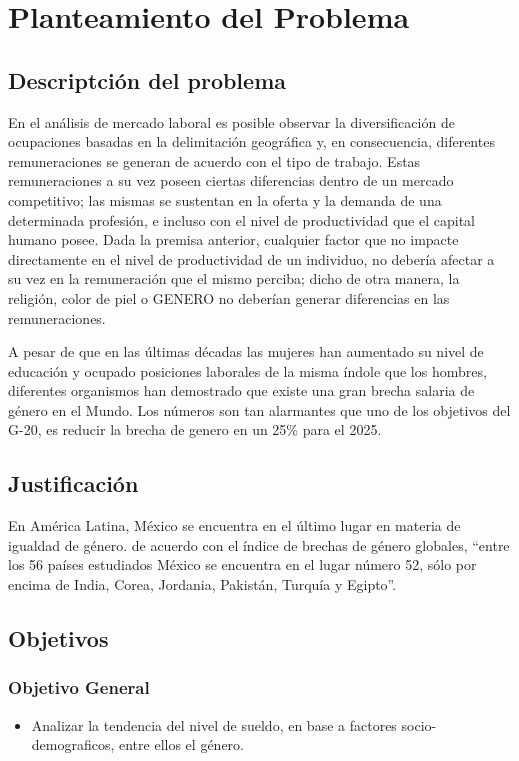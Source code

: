 \newpage
\section{Planteamiento del Problema}

\subsection{Descriptci\'on del problema}
En el an\'alisis de mercado laboral es posible observar la diversificaci\'on de ocupaciones basadas en la delimitaci\'on geogr\'afica y, en consecuencia, diferentes remuneraciones se generan de acuerdo con el tipo de trabajo. Estas remuneraciones a su vez poseen ciertas diferencias dentro de un mercado competitivo; las mismas se sustentan en la oferta y la demanda de una determinada profesi\'on, e incluso con el nivel de productividad que el capital humano posee. Dada la premisa anterior, cualquier factor que no impacte directamente en el nivel de productividad de un individuo, no deber\'ia afectar a su vez en la remuneraci\'on que el mismo perciba; dicho de otra manera, la religi\'on, color de piel o GENERO no deber\'ian generar diferencias en las remuneraciones. \cite{RodriguezPerez_2014}

A pesar de que en las \'ultimas d\'ecadas las mujeres han aumentado su nivel de educaci\'on y ocupado posiciones laborales de la misma \'indole que los hombres, diferentes organismos han demostrado que existe una gran brecha salaria de g\'enero en el Mundo. Los n\'umeros son tan alarmantes que uno de los objetivos del G-20, es reducir la brecha de genero en un 25\% para el 2025. \cite{G20_2019}

\subsection{Justificaci\'on}
En Am\'erica Latina, M\'exico se encuentra en el \'ultimo lugar en materia de igualdad de g\'enero. de acuerdo con el \'indice de brechas de g\'enero globales, ``entre los 56 pa\'ises estudiados M\'exico se encuentra en el lugar n\'umero 52, s\'olo por encima de India, Corea, Jordania, Pakist\'an, Turqu\'ia y Egipto''.\cite{ArceoGomez_2014}


\subsection{Objetivos}
\subsubsection{Objetivo General}
\begin{itemize}
    \item Analizar la tendencia del nivel de sueldo, en base a factores socio-demograficos, entre ellos el g\'enero.
\end{itemize}
